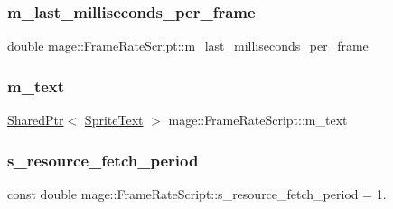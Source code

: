 \subsubsection{\texorpdfstring{m\+\_\+last\+\_\+milliseconds\+\_\+per\+\_\+frame}{m\_last\_milliseconds\_per\_frame}}
{\footnotesize\ttfamily double mage\+::\+Frame\+Rate\+Script\+::m\+\_\+last\+\_\+milliseconds\+\_\+per\+\_\+frame\hspace{0.3cm}{\ttfamily [private]}}

\hypertarget{classmage_1_1_frame_rate_script_a7d55db21f500e92914293cd6850e3b53}{}\label{classmage_1_1_frame_rate_script_a7d55db21f500e92914293cd6850e3b53} 
\subsubsection{\texorpdfstring{m\+\_\+text}{m\_text}}
{\footnotesize\ttfamily \hyperlink{namespacemage_a1e01ae66713838a7a67d30e44c67703e}{Shared\+Ptr}$<$ \hyperlink{classmage_1_1_sprite_text}{Sprite\+Text} $>$ mage\+::\+Frame\+Rate\+Script\+::m\+\_\+text\hspace{0.3cm}{\ttfamily [private]}}

\hypertarget{classmage_1_1_frame_rate_script_ad28027c538faeab0c74bdb7b49f59469}{}\label{classmage_1_1_frame_rate_script_ad28027c538faeab0c74bdb7b49f59469} 
\subsubsection{\texorpdfstring{s\+\_\+resource\+\_\+fetch\+\_\+period}{s\_resource\_fetch\_period}}
{\footnotesize\ttfamily const double mage\+::\+Frame\+Rate\+Script\+::s\+\_\+resource\+\_\+fetch\+\_\+period = 1.\hspace{0.3cm}{\ttfamily [static]}}

